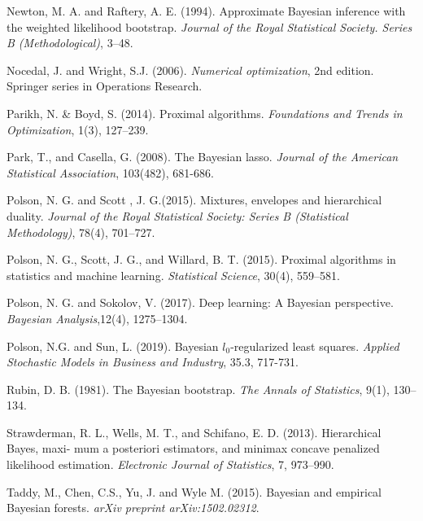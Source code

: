 \documentclass[12pt]{TD-CJS}
\begin{document}
\begin{thebibliography}{}
Newton, M. A. and Raftery, A. E.  (1994). Approximate Bayesian inference with the weighted likelihood bootstrap. {\it Journal of the Royal Statistical Society. Series B (Methodological)}, 3--48.

Nocedal, J. and Wright, S.J. (2006). {\em Numerical optimization}, 2nd edition. Springer series in Operations Research.

Parikh, N. \&  Boyd, S. (2014). Proximal algorithms. {\it Foundations and Trends in Optimization}, 1(3), 127--239.

Park, T., and Casella, G. (2008). The Bayesian lasso. {\it Journal of the American Statistical Association}, 103(482), 681-686.

Polson, N. G. and  Scott , J. G.(2015). Mixtures, envelopes and hierarchical duality. {\it Journal of the Royal Statistical Society: Series B (Statistical Methodology)},  78(4), 701--727.

Polson, N. G.,  Scott, J. G., and  Willard, B. T.  (2015). Proximal algorithms in statistics and machine learning. {\it Statistical Science}, 30(4), 559--581.

Polson, N. G. and  Sokolov, V. (2017). Deep learning: A Bayesian perspective. {\it Bayesian Analysis},12(4), 1275--1304.

Polson, N.G. and Sun, L. (2019). Bayesian $l_0$-regularized least squares. {\em Applied Stochastic Models in Business and 
 Industry},  35.3,  717-731.

Rubin, D. B. (1981). The Bayesian bootstrap. {\it The Annals of Statistics}, 9(1), 130--134.

Strawderman, R. L., Wells, M. T., and Schifano, E. D. (2013). Hierarchical Bayes, maxi- mum a posteriori estimators, and minimax concave penalized likelihood estimation. {\it Electronic Journal of Statistics}, 7, 973--990.

Taddy, M.,  Chen, C.S., Yu, J.  and  Wyle M. (2015). Bayesian and empirical Bayesian forests. {\it arXiv preprint arXiv:1502.02312}.


\end{thebibliography}
\end{document}
